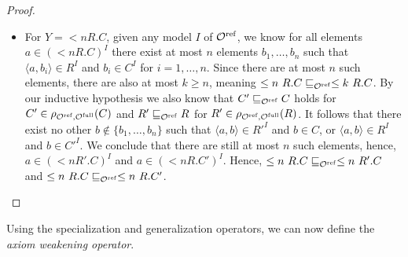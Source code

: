 \begin{proof}
\begin{itemize}
  \item For $Y ={} \less n R.C$, given any model $I$ of ${\mathcal{O}^\textnormal{ref}}$, we know for all elements $a \in (\less n R.C)^I$ there exist at most $n$ elements $b_1, \dots, b_n$ such that $\langle a, b_i \rangle \in R^I$ and $b_i \in C^I$ for $i = 1, \dots, n$. Since there are at most $n$ such elements, there are also at most $k \geq n$, meaning $\leq n~R.C \sqsubseteq_{\mathcal{O}^\textnormal{ref}} \leq k~R.C$. By our inductive hypothesis we also know that $C' \sqsubseteq_{\mathcal{O}^\textnormal{ref}} C$ holds for $C' \in \rho_{{\mathcal{O}^\textnormal{ref}},{\mathcal{O}^\textnormal{full}}}(C)$ and $R' \sqsubseteq_{\mathcal{O}^\textnormal{ref}} R$ for $R' \in \rho_{{\mathcal{O}^\textnormal{ref}},{\mathcal{O}^\textnormal{full}}}(R)$. It follows that there exist no other $b \not\in \{ b_1, \dots, b_n \}$ such that $\langle a, b \rangle \in R'^I$ and $b \in C$, or $\langle a, b \rangle \in R^I$ and $b \in C'^I$. We conclude that there are still at most $n$ such elements, hence, $a \in (\less n R'.C)^I$ and $a \in (\less n R.C')^I$. Hence, $\leq n~R.C \sqsubseteq_{\mathcal{O}^\textnormal{ref}} \leq n~R'.C$ and $\leq n~R.C \sqsubseteq_{\mathcal{O}^\textnormal{ref}} \leq n~R.C'$.
\end{itemize}
\end{proof}

Using the specialization and generalization operators, we can now define the \emph{axiom weakening operator}.

